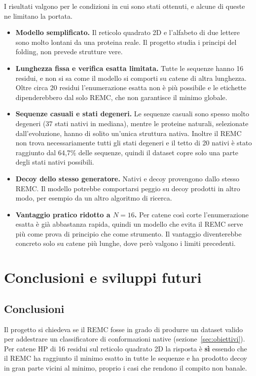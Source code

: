 \documentclass[11pt,a4paper]{article}
\begin{document}
I risultati valgono per le condizioni in cui sono stati ottenuti, e alcune di queste ne limitano la portata.
\begin{itemize}
  \item \textbf{Modello semplificato.} Il reticolo quadrato 2D e l'alfabeto di due lettere sono molto lontani da una proteina reale. Il progetto studia i principi del folding, non prevede strutture vere.
  \item \textbf{Lunghezza fissa e verifica esatta limitata.} Tutte le sequenze hanno 16 residui, e non si sa come il modello si comporti su catene di altra lunghezza. Oltre circa 20 residui l'enumerazione esatta non è più possibile e  le etichette dipenderebbero dal solo REMC, che non garantisce il minimo globale.
  \item \textbf{Sequenze casuali e stati degeneri.} Le sequenze casuali sono spesso molto degeneri (37 stati nativi in mediana), mentre le proteine naturali, selezionate dall'evoluzione, hanno di solito un'unica struttura nativa. Inoltre il REMC non trova necessariamente tutti gli stati degeneri e il tetto di 20 nativi è stato raggiunto dal 64,7\% delle sequenze, quindi il dataset copre solo una parte degli stati nativi possibili.
  \item \textbf{Decoy dello stesso generatore.} Nativi e decoy provengono dallo stesso REMC. Il modello potrebbe comportarsi peggio su decoy prodotti in altro modo, per esempio da un altro algoritmo di ricerca.
  \item \textbf{Vantaggio pratico ridotto a $N = 16$.} Per catene così corte l'enumerazione esatta è già abbastanza rapida, quindi un modello che evita il REMC serve più come prova di principio che come strumento. Il vantaggio diventerebbe concreto solo su catene più lunghe, dove però valgono i limiti precedenti.
\end{itemize}

\section{Conclusioni e sviluppi futuri}
\label{sec:conclusioni}

\subsection{Conclusioni}

Il progetto si chiedeva se il REMC fosse in grado di produrre un dataset valido per addestrare un classificatore di conformazioni native (sezione~\ref{sec:obiettivi}). Per catene HP di 16 residui sul reticolo quadrato 2D la risposta è \textbf{sì} essendo che il REMC ha raggiunto il minimo esatto in tutte le sequenze e ha prodotto decoy in gran parte vicini al minimo, proprio i casi che rendono il compito non banale.
\end{document}

